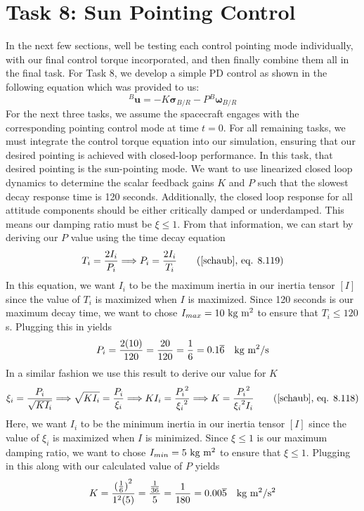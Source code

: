 \documentclass[conf]{new-aiaa}
\begin{document}
\section{Task 8: Sun Pointing Control}
In the next few sections, well be testing each control pointing mode individually, with our final control torque incorporated, and then finally combine them all in the final task. For Task 8, we develop a simple PD control as shown in the following equation which was provided to us:
\[
{}^B\bm{u} = -K\bm{\sigma}_{B/R} - P{}^B\bm{\omega}_{B/R}
\]
For the next three tasks, we assume the spacecraft engages with the corresponding pointing control mode at time $t=0$. For all remaining tasks, we must integrate the control torque equation into our simulation, ensuring that our desired pointing is achieved with closed-loop performance. In this task, that desired pointing is the sun-pointing mode. We want to use linearized closed loop dynamics to determine the scalar feedback gains $K$ and $P$ such that the slowest decay response time is 120 seconds. Additionally, the closed loop response for all attitude components should be either critically damped or underdamped. This means our damping ratio must be $\xi\leq1$. From that information, we can start by deriving our $P$ value using the time decay equation
\[
T_i=\frac{2I_i}{P_i} \Longrightarrow P_i=\frac{2I_i}{T_i} \tag{\cite{schaub},~eq. 8.119}
\]
In this equation, we want $I_i$ to be the maximum inertia in our inertia tensor $[I]$ since the value of $T_i$ is maximized when $I$ is maximized. Since 120 seconds is our maximum decay time, we want to chose $I_{max}=10 \text{ kg m\textsuperscript{2}}$ to ensure that $T_i\leq120$s. Plugging this in yields
\[
P_i = \frac{2(10)}{120} = \frac{20}{120} = \frac{1}{6} = 0.1\overline{6}\quad \text{kg m\textsuperscript{2}/s}
\]
In a similar fashion we use this result to derive our value for $K$
\[
\xi_i=\frac{P_i}{\sqrt{KI_i}} \Longrightarrow \sqrt{KI_i}=\frac{P_i}{\xi_i} \Longrightarrow KI_i=\frac{{P_i}^2}{{\xi_i}^2} \Longrightarrow K=\frac{{P_i}^2}{{\xi_i}^2I_i} \tag{\cite{schaub},~eq. 8.118}
\]
Here, we want $I_i$ to be the minimum inertia in our inertia tensor $[I]$ since the value of $\xi_i$ is maximized when $I$ is minimized. Since $\xi\leq1$ is our maximum damping ratio, we want to chose $I_{min}=5 \text{ kg m\textsuperscript{2}}$ to ensure that $\xi\leq1$. Plugging in this along with our calculated value of $P$ yields
\[
K = \frac{{(\frac{1}{6})}^2}{1^2(5)} = \frac{\frac{1}{36}}{5} = \frac{1}{180} = 0.00\overline{5} \quad \text{kg m\textsuperscript{2}/s\textsuperscript{2}}
\]
\end{document}
